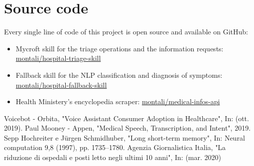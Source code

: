 \documentclass[conference]{IEEEtran}
\begin{document}
\section{Source code}
Every single line of code of this project is open source and available on GitHub:
\begin{itemize}
    \item Mycroft skill for the triage operations and the information requests: \href{https://github.com/montali/hospital-triage-skill}{montali/hospital-triage-skill}
    \item Fallback skill for the NLP classification and diagnosis of symptoms: \href{https://github.com/montali/hospital-fallback-skill}{montali/hospital-fallback-skill}
    \item Health Ministery's encyclopedia scraper: \href{https://github.com/montali/medical-infos-api}{montali/medical-infos-api}
\end{itemize}

\begin{thebibliography}{00}
     Voicebot - Orbita, "Voice Assistant Consumer Adoption in Healthcare", In: (ott. 2019).
     Paul Mooney - Appen, "Medical Speech, Transcription, and Intent", 2019.
     Sepp Hochreiter e Jürgen Schmidhuber, "Long short-term memory", In: Neural computation 9,8 (1997), pp. 1735–1780.
     Agenzia Giornalistica Italia, "La riduzione di ospedali e posti letto negli ultimi 10 anni", In: (mar. 2020)
\end{thebibliography}
\end{document}
